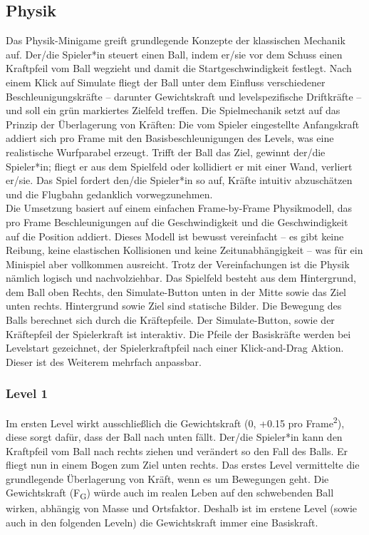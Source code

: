 \subsection{Physik}
Das Physik-Minigame greift grundlegende Konzepte der klassischen Mechanik auf. Der/die Spieler*in steuert einen Ball, indem er/sie vor dem Schuss einen Kraftpfeil vom Ball wegzieht und damit die Startgeschwindigkeit festlegt. Nach einem Klick auf \glqq{}Simulate\grqq{} fliegt der Ball unter dem Einfluss verschiedener Beschleunigungskräfte – darunter Gewichtskraft und levelspezifische Driftkräfte – und soll ein grün markiertes Zielfeld treffen.
Die Spielmechanik setzt auf das Prinzip der Überlagerung von Kräften: Die vom Spieler eingestellte Anfangskraft addiert sich pro Frame mit den Basisbeschleunigungen des Levels, was eine realistische Wurfparabel erzeugt. Trifft der Ball das Ziel, gewinnt der/die Spieler*in; fliegt er aus dem Spielfeld oder kollidiert er mit einer Wand, verliert er/sie. Das Spiel fordert den/die Spieler*in so auf, Kräfte intuitiv abzuschätzen und die Flugbahn gedanklich vorwegzunehmen. \\
Die Umsetzung basiert auf einem einfachen Frame-by-Frame Physikmodell, das pro Frame Beschleunigungen auf die Geschwindigkeit und die Geschwindigkeit auf die Position addiert. Dieses Modell ist bewusst vereinfacht – es gibt keine Reibung, keine elastischen Kollisionen und keine Zeitunabhängigkeit – was für ein Minispiel aber vollkommen ausreicht. Trotz der Vereinfachungen ist die Physik nämlich logisch und nachvolziehbar.
Das Spielfeld besteht aus dem Hintergrund, dem Ball oben Rechts, den Simulate-Button unten in der Mitte sowie das Ziel unten rechts. Hintergrund sowie Ziel sind statische Bilder. Die Bewegung des Balls berechnet sich durch die Kräftepfeile. Der Simulate-Button, sowie der Kräftepfeil der Spielerkraft ist interaktiv. Die Pfeile der Basiskräfte werden bei Levelstart gezeichnet, der Spielerkraftpfeil nach einer Klick-and-Drag Aktion. Dieser ist des Weiterem mehrfach anpassbar.

\subsubsection{Level 1}
Im ersten Level wirkt ausschließlich die Gewichtskraft (0, +0.15 pro Frame\textsuperscript{2}), diese sorgt dafür, dass der Ball nach unten fällt.
Der/die Spieler*in kann den Kraftpfeil vom Ball nach rechts ziehen und verändert so den Fall des Balls. Er fliegt nun in einem Bogen zum Ziel unten rechts.
Das erstes Level vermittelte die grundlegende Überlagerung von Kräft, wenn es um Bewegungen geht. Die Gewichtskraft (F\textsubscript{G}) würde auch im realen Leben auf den \glqq{}schwebenden\grqq{} Ball wirken, abhängig von Masse und Ortsfaktor. Deshalb ist im erstene Level (sowie auch in den folgenden Leveln) die Gewichtskraft immer eine Basiskraft.

